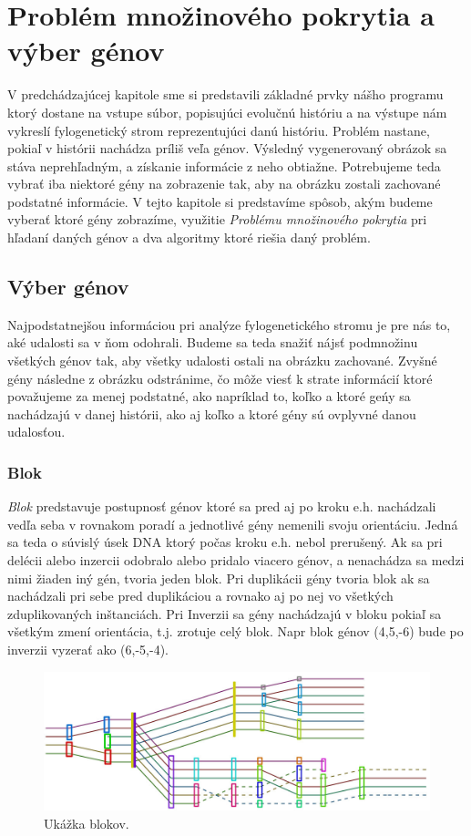 \chapter{Problém množinového pokrytia a výber génov}
\label{chap:setcover}
V predchádzajúcej kapitole sme si predstavili základné prvky nášho programu ktorý dostane na vstupe súbor, 
popisujúci evolučnú históriu a na výstupe nám vykreslí fylogenetický strom reprezentujúci danú históriu.
Problém nastane, pokiaľ v histórii nachádza príliš veľa génov. Výsledný vygenerovaný obrázok sa stáva neprehľadným, 
a získanie informácie z neho obtiažne. 
Potrebujeme teda vybrať iba niektoré gény na zobrazenie tak, aby na obrázku zostali zachované podstatné informácie.
V tejto kapitole si predstavíme spôsob, akým budeme vyberať ktoré gény zobrazíme,
využitie \emph{Problému množinového pokrytia} pri hľadaní daných génov a dva algoritmy ktoré riešia daný problém.
\section{Výber génov}
Najpodstatnejšou informáciou pri analýze fylogenetického stromu je pre nás to, aké udalosti sa v ňom odohrali. 
Budeme sa teda snažiť nájsť podmnožinu všetkých génov tak, aby všetky udalosti ostali na obrázku zachované.
Zvyšné gény následne z obrázku odstránime, čo môže viesť k strate informácií ktoré považujeme za menej podstatné, 
ako napríklad to, koľko a ktoré geńy sa nachádzajú v danej histórii, ako aj koľko a ktoré gény sú ovplyvné danou udalosťou.
\subsection{Blok}\label{blok}
\emph{Blok} predstavuje postupnosť génov ktoré sa pred aj po kroku e.h. nachádzali vedľa seba v rovnakom poradí a jednotlivé gény nemenili svoju orientáciu. Jedná sa teda o súvislý
úsek DNA ktorý počas kroku e.h. nebol prerušený.
Ak sa pri delécii alebo inzercii odobralo alebo pridalo viacero génov, a nenachádza sa medzi nimi žiaden iný gén, tvoria jeden blok.
Pri duplikácii gény tvoria blok ak sa nachádzali pri sebe pred duplikáciou a rovnako aj po nej vo všetkých zduplikovaných inštanciách.
Pri Inverzii sa gény nachádzajú v bloku pokiaľ sa všetkým zmení orientácia, t.j. zrotuje celý blok.
Napr blok génov (4,5,-6) bude po inverzii vyzerať ako (6,-5,-4).
\begin{figure}[t]
 \centering
\includegraphics[width=1\textwidth]{images/bloky}
\caption{Ukážka blokov.}\label{obr:bloky}
\end{figure}
